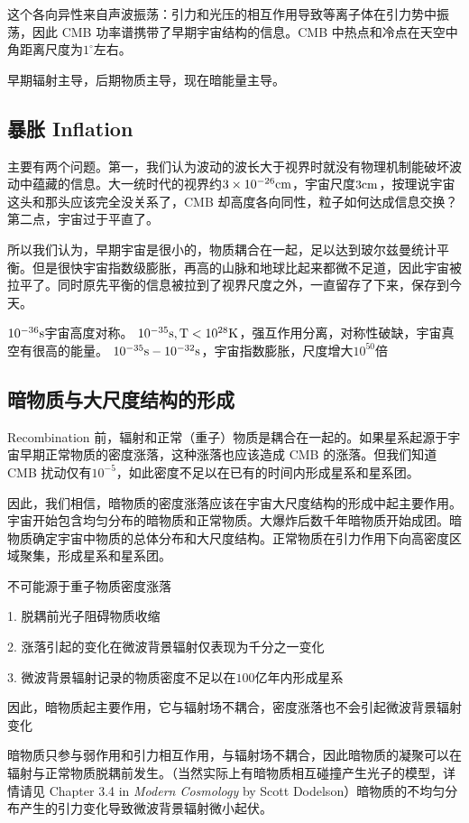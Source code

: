 \documentclass[../天体物理基础.tex]{subfiles}
\begin{document}
这个各向异性来自声波振荡：引力和光压的相互作用导致等离子体在引力势中振荡，因此 CMB 功率谱携带了早期宇宙结构的信息。CMB 中热点和冷点在天空中角距离尺度为$1^{\circ}$左右。

早期辐射主导，后期物质主导，现在暗能量主导。



\subsection{暴胀 Inflation}
主要有两个问题。第一，我们认为波动的波长大于视界时就没有物理机制能破坏波动中蕴藏的信息。大一统时代的视界约$3\times10^{-26}\rm cm$，宇宙尺度$3\rm cm$，按理说宇宙这头和那头应该完全没关系了，CMB 却高度各向同性，粒子如何达成信息交换？第二点，宇宙过于平直了。

所以我们认为，早期宇宙是很小的，物质耦合在一起，足以达到玻尔兹曼统计平衡。但是很快宇宙指数级膨胀，再高的山脉和地球比起来都微不足道，因此宇宙被拉平了。同时原先平衡的信息被拉到了视界尺度之外，一直留存了下来，保存到今天。

$10^{-36}\rm s$宇宙高度对称。
$10^{-35}\rm s,T<10^{28}\rm K$，强互作用分离，对称性破缺，宇宙真空有很高的能量。
$10^{-35}\rm s-10^{-32}s$，宇宙指数膨胀，尺度增大$10^{50}$倍

\subsection{暗物质与大尺度结构的形成}
Recombination 前，辐射和正常（重子）物质是耦合在一起的。如果星系起源于宇宙早期正常物质的密度涨落，这种涨落也应该造成 CMB 的涨落。但我们知道 CMB 扰动仅有$10^{-5}$，如此密度不足以在已有的时间内形成星系和星系团。

因此，我们相信，暗物质的密度涨落应该在宇宙大尺度结构的形成中起主要作用。宇宙开始包含均匀分布的暗物质和正常物质。大爆炸后数千年暗物质开始成团。暗物质确定宇宙中物质的总体分布和大尺度结构。正常物质在引力作用下向高密度区域聚集，形成星系和星系团。

不可能源于重子物质密度涨落

1. 脱耦前光子阻碍物质收缩

2. 涨落引起的变化在微波背景辐射仅表现为千分之一变化

3. 微波背景辐射记录的物质密度不足以在$100$亿年内形成星系

因此，暗物质起主要作用，它与辐射场不耦合，密度涨落也不会引起微波背景辐射变化


暗物质只参与弱作用和引力相互作用，与辐射场不耦合，因此暗物质的凝聚可以在辐射与正常物质脱耦前发生。（当然实际上有暗物质相互碰撞产生光子的模型，详情请见 Chapter 3.4 in \textit{Modern Cosmology} by Scott Dodelson）暗物质的不均匀分布产生的引力变化导致微波背景辐射微小起伏。
\end{document}
